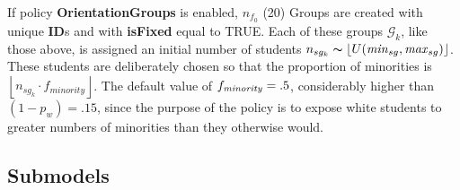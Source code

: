 If policy \textbf{OrientationGroups} is enabled, $n_{f_0}$ (20) Groups are
created with unique \textbf{ID}s and with \textbf{isFixed} equal to TRUE. Each
of these groups $\mathcal{G}_k$, like those above, is assigned an initial
number of students $n_{sg_k} \thicksim \left\lfloor
U(\text{\textit{min}}_{sg},\text{\textit{max}}_{sg}) \right\rfloor$. These
students are deliberately chosen so that the proportion of minorities is
$\left\lfloor n_{sg_k} \cdot f_{\textit{minority}} \right \rfloor$. The
default value of $f_{\text{\textit{minority}}}=.5$, considerably higher than
$(1-p_w)=.15$, since the purpose of the policy is to expose white students to
greater numbers of minorities than they otherwise would.


\subsection{Submodels}

